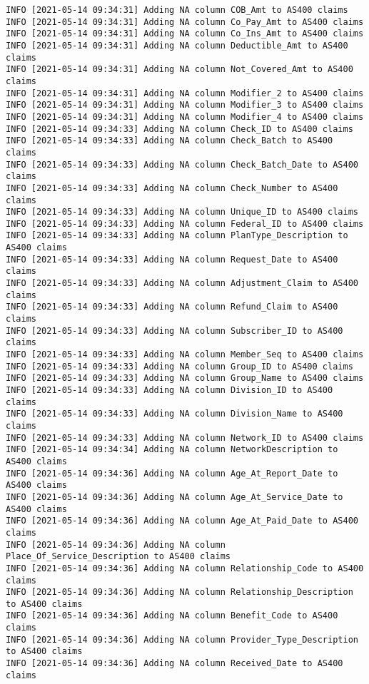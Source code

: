 \documentclass[
]{book}
\begin{document}
\begin{verbatim}
INFO [2021-05-14 09:34:31] Adding NA column COB_Amt to AS400 claims
INFO [2021-05-14 09:34:31] Adding NA column Co_Pay_Amt to AS400 claims
INFO [2021-05-14 09:34:31] Adding NA column Co_Ins_Amt to AS400 claims
INFO [2021-05-14 09:34:31] Adding NA column Deductible_Amt to AS400 claims
INFO [2021-05-14 09:34:31] Adding NA column Not_Covered_Amt to AS400 claims
INFO [2021-05-14 09:34:31] Adding NA column Modifier_2 to AS400 claims
INFO [2021-05-14 09:34:31] Adding NA column Modifier_3 to AS400 claims
INFO [2021-05-14 09:34:31] Adding NA column Modifier_4 to AS400 claims
INFO [2021-05-14 09:34:33] Adding NA column Check_ID to AS400 claims
INFO [2021-05-14 09:34:33] Adding NA column Check_Batch to AS400 claims
INFO [2021-05-14 09:34:33] Adding NA column Check_Batch_Date to AS400 claims
INFO [2021-05-14 09:34:33] Adding NA column Check_Number to AS400 claims
INFO [2021-05-14 09:34:33] Adding NA column Unique_ID to AS400 claims
INFO [2021-05-14 09:34:33] Adding NA column Federal_ID to AS400 claims
INFO [2021-05-14 09:34:33] Adding NA column PlanType_Description to AS400 claims
INFO [2021-05-14 09:34:33] Adding NA column Request_Date to AS400 claims
INFO [2021-05-14 09:34:33] Adding NA column Adjustment_Claim to AS400 claims
INFO [2021-05-14 09:34:33] Adding NA column Refund_Claim to AS400 claims
INFO [2021-05-14 09:34:33] Adding NA column Subscriber_ID to AS400 claims
INFO [2021-05-14 09:34:33] Adding NA column Member_Seq to AS400 claims
INFO [2021-05-14 09:34:33] Adding NA column Group_ID to AS400 claims
INFO [2021-05-14 09:34:33] Adding NA column Group_Name to AS400 claims
INFO [2021-05-14 09:34:33] Adding NA column Division_ID to AS400 claims
INFO [2021-05-14 09:34:33] Adding NA column Division_Name to AS400 claims
INFO [2021-05-14 09:34:33] Adding NA column Network_ID to AS400 claims
INFO [2021-05-14 09:34:34] Adding NA column NetworkDescription to AS400 claims
INFO [2021-05-14 09:34:36] Adding NA column Age_At_Report_Date to AS400 claims
INFO [2021-05-14 09:34:36] Adding NA column Age_At_Service_Date to AS400 claims
INFO [2021-05-14 09:34:36] Adding NA column Age_At_Paid_Date to AS400 claims
INFO [2021-05-14 09:34:36] Adding NA column Place_Of_Service_Description to AS400 claims
INFO [2021-05-14 09:34:36] Adding NA column Relationship_Code to AS400 claims
INFO [2021-05-14 09:34:36] Adding NA column Relationship_Description to AS400 claims
INFO [2021-05-14 09:34:36] Adding NA column Benefit_Code to AS400 claims
INFO [2021-05-14 09:34:36] Adding NA column Provider_Type_Description to AS400 claims
INFO [2021-05-14 09:34:36] Adding NA column Received_Date to AS400 claims

\end{verbatim}
\end{document}

